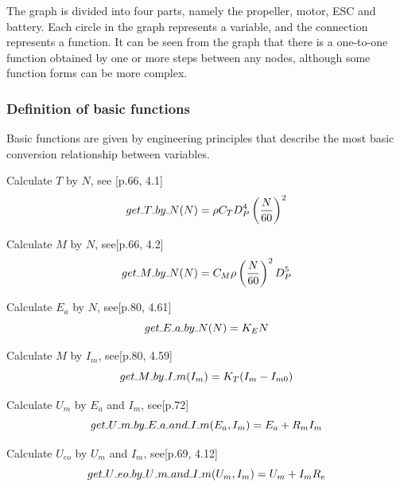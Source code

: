 \documentclass{article} %
\numberwithin{equation}{section} %
\newcommand{\SL}{\rule{.3em}{.3pt}} %
\begin{document}
The graph is divided into four parts, namely the propeller, motor, ESC and battery.
Each circle in the graph represents a variable, and the connection represents a function.
It can be seen from the graph that there is a one-to-one function obtained by one or more steps between any nodes, although some function forms can be more complex.

\subsubsection{Definition of basic functions}\label{main:basic:basic_functions}

Basic functions are given by engineering principles that describe the most basic conversion relationship between variables. 

Calculate $T$ by $N$, see \cite{qq}[p.66, 4.1]
\begin{equation}
get\SL T\SL by\SL N (N) = \rho C_T D_P^4 \left(\frac N {60} \right)^2 \label{basic.get_T_by_N}
\end{equation}

Calculate $M$ by $N$, see\cite{qq}[p.66, 4.2]
\begin{equation}
get\SL M\SL by\SL N (N) = C_M\rho \left(\frac N {60} \right)^2 D_P^5 \label{basic.get_M_by_N}
\end{equation}

Calculate $E_a$ by $N$, see\cite{qq}[p.80, 4.61]
\begin{equation}
get\SL E\SL a\SL by\SL N (N) = K_{E} N \label{basic.get_E_a_by_N}
\end{equation}

Calculate $M$ by $I_m$, see\cite{qq}[p.80, 4.59]
\begin{equation}
get\SL M\SL by\SL I\SL m (I_m) = K_T (I_m - I_{m0}) \label{basic.get_M_by_I_m}
\end{equation}

Calculate $U_m$ by $E_a$ and $I_m$, see\cite{qq}[p.72]
\begin{equation}
get\SL U\SL m\SL by\SL E\SL a\SL and\SL I\SL m (E_a, I_m) = E_a + R_m I_m \label{basic.get_U_m_by_E_a_and_I_m}
\end{equation}

Calculate $U_{eo}$ by $U_m$ and $I_m$, see\cite{qq}[p.69, 4.12]
\begin{equation}
get\SL U\SL eo\SL by\SL U\SL m\SL and\SL I\SL m (U_m, I_m) = U_m + I_m R_e\label{basic.get_U_eo_by_U_m_and_I_m}
\end{equation}
\end{document}
